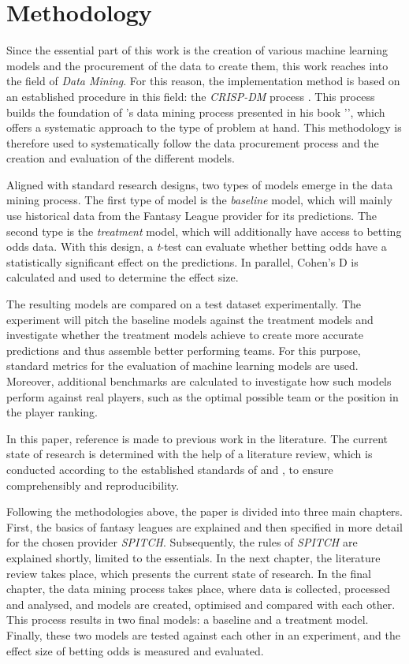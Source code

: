 \clearpage \section{Methodology}

Since the essential part of this work is the creation of various machine learning models and the procurement of the data to create them, this work reaches into the field of \emph{Data Mining}. For this reason, the implementation method is based on an established procedure in this field: the \emph{CRISP-DM} process \parencite{chapman_crisp-dm_2000}. This process builds the foundation of \citeauthor[]{geron_hands-machine_2019}'s data mining process presented in his book '', which offers a systematic approach to the type of problem at hand. This methodology is therefore used to systematically follow the data procurement process and the creation and evaluation of the different models.

Aligned with standard research designs, two types of models emerge in the data mining process. The first type of model is the \emph{baseline} model, which will mainly use historical data from the Fantasy League provider for its predictions. The second type is the \emph{treatment} model, which will additionally have access to betting odds data. With this design, a \emph{t}-test can evaluate whether betting odds have a statistically significant effect on the predictions. In parallel, Cohen's D is calculated and used to determine the effect size.

The resulting models are compared on a test dataset experimentally. The experiment will pitch the baseline models against the treatment models and investigate whether the treatment models achieve to create more accurate predictions and thus assemble better performing teams. For this purpose, standard metrics for the evaluation of machine learning models are used. Moreover, additional benchmarks are calculated to investigate how such models perform against real players, such as the optimal possible team or the position in the player ranking.

\clearpage In this paper, reference is made to previous work in the literature. The current state of research is determined with the help of a literature review, which is conducted according to the established standards of \citeauthor[]{webster_guest_2002} and \citeauthor[]{vom_brocke_standing_2015}, to ensure comprehensibly and reproducibility.

Following the methodologies above, the paper is divided into three main chapters. First, the basics of fantasy leagues are explained and then specified in more detail for the chosen provider \emph{SPITCH}. Subsequently, the rules of \emph{SPITCH} are explained shortly, limited to the essentials. In the next chapter, the literature review takes place, which presents the current state of research. In the final chapter, the data mining process takes place, where data is collected, processed and analysed, and models are created, optimised and compared with each other. This process results in two final models: a baseline and a treatment model. Finally, these two models are tested against each other in an experiment, and the effect size of betting odds is measured and evaluated.
